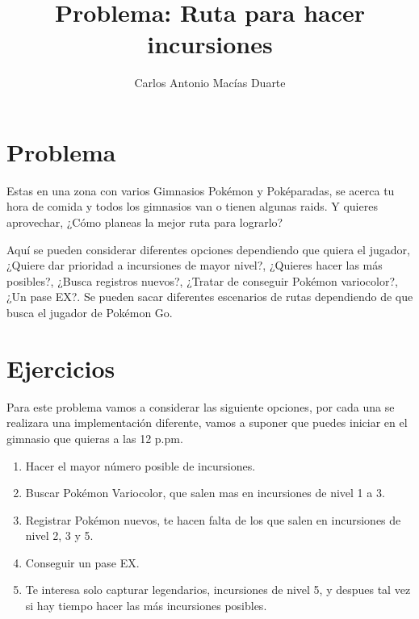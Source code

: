 \documentclass[10pt,letterpaper,twoside,openright]{article}
\author{Carlos Antonio Macías Duarte}
\title{Problema: Ruta para hacer incursiones}
\begin{document}
	\maketitle
		
	\section{Problema}
	
		Estas en una zona con varios Gimnasios Pokémon y Poképaradas, se acerca tu hora de comida y todos los gimnasios van o tienen algunas raids. Y quieres aprovechar, ¿Cómo planeas la mejor ruta para lograrlo?
		
		Aquí se pueden considerar diferentes opciones dependiendo que quiera el jugador, ¿Quiere dar prioridad a incursiones de mayor nivel?, ¿Quieres hacer las más posibles?, ¿Busca registros nuevos?, ¿Tratar de conseguir Pokémon variocolor?, ¿Un pase EX?. Se pueden sacar diferentes escenarios de rutas dependiendo de que busca el jugador de Pokémon Go.
		
	\section{Ejercicios}
	
		Para este problema vamos a considerar las siguiente opciones, por cada una se realizara una implementación diferente, vamos a suponer que puedes iniciar en el gimnasio que quieras a las 12 p.pm.
		
		
		\begin{enumerate}
			\item Hacer el mayor número posible de incursiones.
			\item Buscar Pokémon Variocolor, que salen mas en incursiones de nivel 1 a 3.
			\item Registrar Pokémon nuevos, te hacen falta de los que salen en incursiones de nivel 2, 3 y 5.
			\item Conseguir un pase EX.
			\item Te interesa solo capturar legendarios, incursiones de nivel 5, y despues tal vez si hay tiempo hacer las más incursiones posibles.
		\end{enumerate}
		
\end{document}
